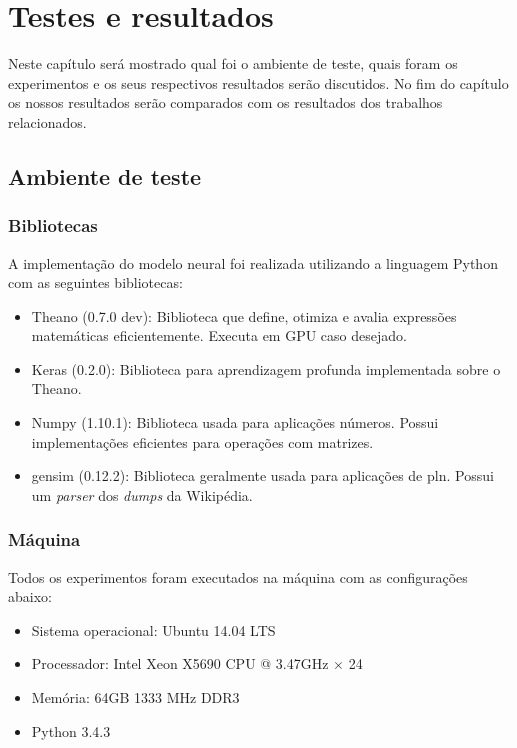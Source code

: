 \chapter{Testes e resultados}\label{resultados}

Neste capítulo será mostrado qual foi o ambiente de teste, quais foram os experimentos e os seus respectivos resultados serão discutidos. No fim do capítulo os nossos resultados serão comparados com os resultados dos trabalhos relacionados. 


\section{Ambiente de teste}

\subsection{Bibliotecas}

A implementação do modelo neural foi realizada utilizando a linguagem Python com as seguintes bibliotecas:

\begin{itemize}
\item Theano (0.7.0 dev): Biblioteca que define, otimiza e avalia expressões matemáticas eficientemente. Executa em GPU caso desejado.
\item Keras (0.2.0): Biblioteca para aprendizagem profunda implementada sobre o Theano.
\item Numpy (1.10.1): Biblioteca usada para aplicações números. Possui implementações eficientes para operações com matrizes.
\item gensim (0.12.2): Biblioteca geralmente usada para aplicações de \ac{pln}. Possui um \textit{parser} dos \textit{dumps} da Wikipédia.
\end{itemize}


\subsection{Máquina}

Todos os experimentos foram executados na máquina com as configurações abaixo:

\begin{itemize}
\item Sistema operacional: Ubuntu 14.04 LTS
\item Processador: Intel Xeon X5690 CPU @ 3.47GHz $\times$ 24
\item Memória: 64GB 1333 MHz DDR3
\item Python 3.4.3
\end{itemize}


